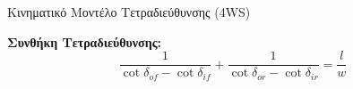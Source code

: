 \documentclass[10pt, compress, handout]{beamer} %
\begin{document}
\begin{frame}{Κινηματικό Μοντέλο Τετραδιεύθυνσης (4WS)}
	\begin{figure}[!ht]
	\end{figure}
	\textbf{Συνθήκη Τετραδιεύθυνσης:}
	\begin{equation*}
		\frac{1}{\cot{\delta_{of}} - \cot{\delta_{if}}} + \frac{1}{\cot{\delta_{or}} - 	\cot{\delta_{ir}}} = \frac{l}{w}
	\end{equation*}
\end{frame}
\end{document}
